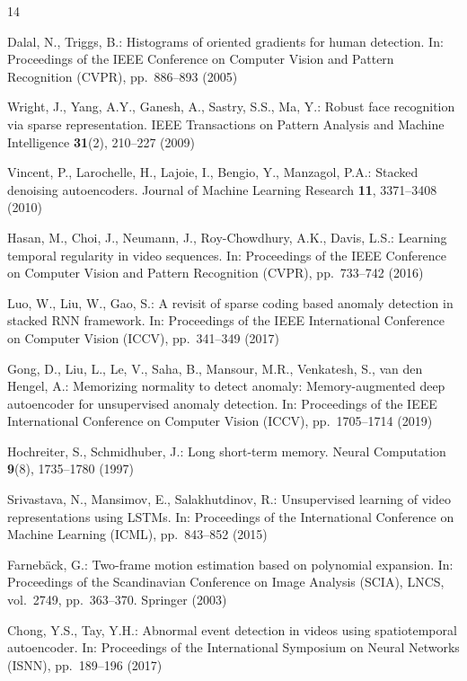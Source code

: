 \documentclass[runningheads]{llncs}
\begin{document}
\begin{thebibliography}{14}

Dalal, N., Triggs, B.: Histograms of oriented gradients for human
detection. In: Proceedings of the IEEE Conference on Computer Vision and
Pattern Recognition (CVPR), pp.~886--893 (2005)

Wright, J., Yang, A.Y., Ganesh, A., Sastry, S.S., Ma, Y.: Robust face
recognition via sparse representation. IEEE Transactions on Pattern
Analysis and Machine Intelligence \textbf{31}(2), 210--227 (2009)

Vincent, P., Larochelle, H., Lajoie, I., Bengio, Y., Manzagol, P.A.:
Stacked denoising autoencoders. Journal of Machine Learning Research
\textbf{11}, 3371--3408 (2010)

Hasan, M., Choi, J., Neumann, J., Roy-Chowdhury, A.K., Davis, L.S.:
Learning temporal regularity in video sequences. In: Proceedings of the
IEEE Conference on Computer Vision and Pattern Recognition (CVPR),
pp.~733--742 (2016)

Luo, W., Liu, W., Gao, S.: A revisit of sparse coding based anomaly
detection in stacked RNN framework. In: Proceedings of the IEEE
International Conference on Computer Vision (ICCV), pp.~341--349 (2017)

Gong, D., Liu, L., Le, V., Saha, B., Mansour, M.R., Venkatesh, S., van
den Hengel, A.: Memorizing normality to detect anomaly: Memory-augmented
deep autoencoder for unsupervised anomaly detection. In: Proceedings of
the IEEE International Conference on Computer Vision (ICCV),
pp.~1705--1714 (2019)

Hochreiter, S., Schmidhuber, J.: Long short-term memory. Neural
Computation \textbf{9}(8), 1735--1780 (1997)

Srivastava, N., Mansimov, E., Salakhutdinov, R.: Unsupervised learning of
video representations using LSTMs. In: Proceedings of the International
Conference on Machine Learning (ICML), pp.~843--852 (2015)

Farneb\"{a}ck, G.: Two-frame motion estimation based on polynomial
expansion. In: Proceedings of the Scandinavian Conference on Image
Analysis (SCIA), LNCS, vol.~2749, pp.~363--370. Springer (2003)

Chong, Y.S., Tay, Y.H.: Abnormal event detection in videos using
spatiotemporal autoencoder. In: Proceedings of the International
Symposium on Neural Networks (ISNN), pp.~189--196 (2017)


\end{thebibliography}
\end{document}
